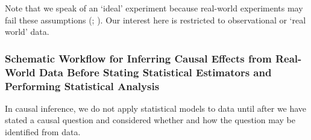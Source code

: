 \documentclass[
  single column]{article}
\begin{document}
Note that we speak of an `ideal' experiment because real-world
experiments may fail these assumptions
(;
). Our interest
here is restricted to observational or `real world' data.

\subsubsection{Schematic Workflow for Inferring Causal Effects from
Real-World Data Before Stating Statistical Estimators and Performing
Statistical
Analysis}\label{schematic-workflow-for-inferring-causal-effects-from-real-world-data-before-stating-statistical-estimators-and-performing-statistical-analysis}

In causal inference, we do not apply statistical models to data until
after we have stated a causal question and considered whether and how
the question may be identified from data.
\end{document}
